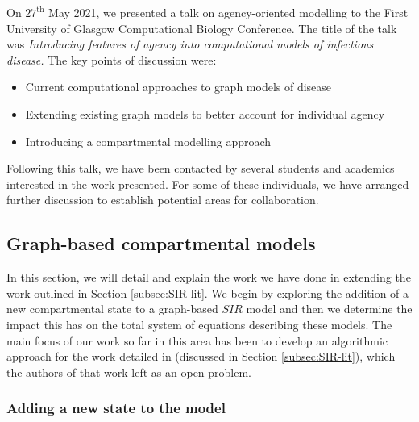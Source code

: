 \documentclass[../report.tex]{subfiles}
\begin{document}
On $27^{\text{th}}$ May 2021, we presented a talk on agency-oriented modelling to the First University of Glasgow Computational Biology Conference. The title of the talk was {\it Introducing features of agency into computational models of infectious disease.}
The key points of discussion were:
\begin{itemize}
\item Current computational approaches to graph models of disease
\item Extending existing graph models to better account for individual agency
\item Introducing a compartmental modelling approach
\end{itemize} 

Following this talk, we have been contacted by several students and academics interested in the work presented. For some of these individuals, we have arranged further discussion to establish potential areas for collaboration.


\subsection{Graph-based compartmental models}

In this section, we will detail and explain the work we have done in extending the work outlined in Section \ref{subsec:SIR-lit}. We begin by exploring the addition of a new compartmental state to a graph-based $SIR$ model and then we determine the impact this has on the total system of equations describing these models. The main focus of our work so far in this area has been to develop an algorithmic approach for the work detailed in \cite{kiss_2014} (discussed in Section \ref{subsec:SIR-lit}), which the authors of that work left as an open problem.

\subsubsection{Adding a new state to the model}
\end{document}
